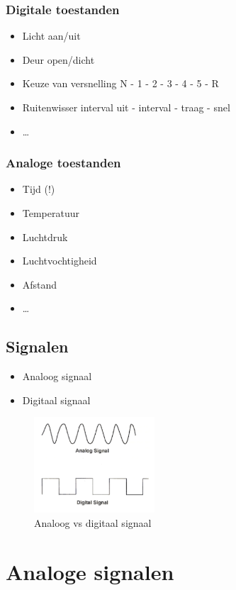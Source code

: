 \documentclass{article}
\begin{document}
\subsubsection{Digitale toestanden}
\begin{itemize}
    \item Licht aan/uit
    \item Deur open/dicht
    \item Keuze van versnelling N - 1 - 2 - 3 - 4 - 5 - R
    \item Ruitenwisser interval uit - interval - traag - snel
    \item \dots
\end{itemize}

\subsubsection{Analoge toestanden}
\begin{itemize}
    \item Tijd (!)
    \item Temperatuur
    \item Luchtdruk
    \item Luchtvochtigheid
    \item Afstand
    \item \dots
\end{itemize}


\subsection{Signalen}
\begin{itemize}
    \item Analoog signaal
    \item Digitaal signaal
\end{itemize}

\begin{figure}[H]
    \centering
    \includegraphics[width=0.4\textwidth]{Screenshot_20200217_115642.png}
    \caption{Analoog vs digitaal signaal}
\end{figure}
\section{Analoge signalen}
\end{document}
